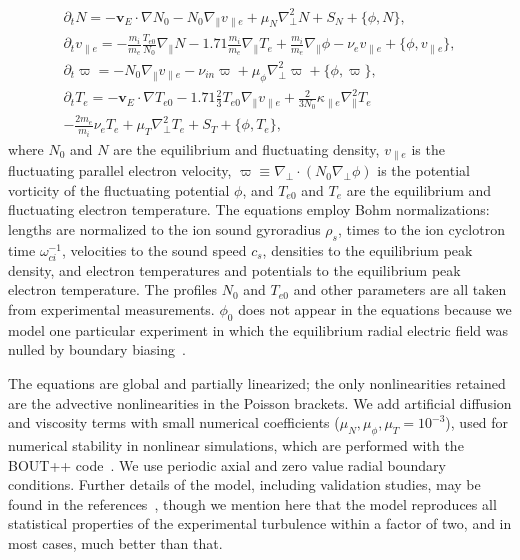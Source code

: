 \documentclass[showpacs,preprintnumbers,amsmath,amssymb,superscriptaddress,aip]{revtex4-1}
\def\beqar{\begin{eqnarray}}
\def\eeqar{\end{eqnarray}}
\newcommand{\pdt}{\partial_t}
\def\grad{\nabla}
\newcommand{\gradpar}{\grad_\parallel}
\newcommand{\gradperp}{\grad_\perp}
\newcommand{\vpe}{v_{\parallel e}}
\newcommand{\nue}{\nu_{e}}
\newcommand{\nuin}{\nu_{in}}
\newcommand{\kpe}{\kappa_{\parallel e}}
\newcommand{\fmie}{\frac{m_i}{m_e}}
\begin{document}
\beqar
\label{ni_eq}
\pdt N = - {\mathbf v_E} \cdot \grad N_0 - N_0 \gradpar \vpe + \mu_N \gradperp^2 N + S_N + \{\phi,N\}, \\
\label{ve_eq}
\pdt \vpe = - \fmie \frac{T_{e0}}{N_0} \gradpar N - 1.71 \fmie \gradpar T_e  + \fmie \gradpar \phi - \nue \vpe + \{\phi,\vpe \}, \\
\label{rho_eq}
\pdt \varpi = - N_0 \gradpar \vpe  - \nuin \varpi + \mu_\phi \gradperp^2 \varpi + \{\phi,\varpi \}, \\
\label{te_eq}
\pdt T_e = - {\mathbf v_E} \cdot \grad T_{e0} - 1.71 \frac{2}{3} T_{e0} \gradpar \vpe + \frac{2}{3 N_0} \kpe \gradpar^2 T_e  \nonumber \\
- \frac{2 m_e}{m_i} \nue T_e  + \mu_T \gradperp^2 T_e +  S_T + \{\phi,T_e\},
\eeqar
where $N_0$ and $N$ are the equilibrium and fluctuating density, $\vpe$ is the fluctuating parallel electron velocity, $\varpi \equiv \gradperp \cdot (N_0 \gradperp \phi)$ is the potential vorticity
of the fluctuating potential $\phi$, and $T_{e0}$ and $T_e$ are the equilibrium and fluctuating electron temperature. The equations employ Bohm normalizations: lengths are
normalized to the ion sound gyroradius $\rho_s$, times to the ion cyclotron time $\omega_{ci}^{-1}$, velocities to the sound speed $c_s$, densities to the equilibrium peak density, and electron
temperatures and potentials to the equilibrium peak electron temperature. The profiles $N_0$ and $T_{e0}$ and other parameters are all taken from experimental measurements. $\phi_0$ 
does not appear in the equations because we model one particular experiment in which the equilibrium radial electric field was nulled by boundary biasing~\cite{schaffner2012}. 

The equations are global and partially linearized; the only nonlinearities retained are the advective nonlinearities in the Poisson brackets. 
We add artificial diffusion and viscosity terms with small numerical coefficients ($\mu_N, \mu_\phi, \mu_T = 10^{-3}$), 
used for numerical stability in nonlinear simulations, which are performed with the BOUT++ code~\cite{dudson2009}. We use periodic axial and zero value radial 
boundary conditions. Further details of the model, including validation studies, may be found in the references~\cite{Popovich2010a,Popovich2010b,Umansky2011,friedman2012b,friedman2013},
though we mention here that the model reproduces all statistical properties of the experimental turbulence within a factor of two, and in most cases, much better than that.
\end{document}
